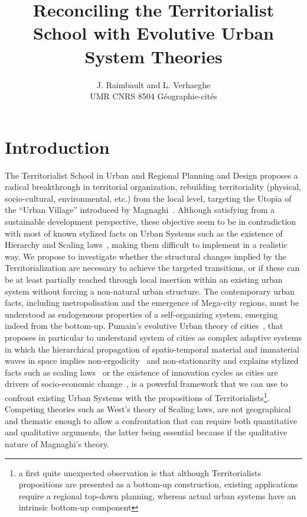 \documentclass{article}
\begin{document}
\title{Reconciling the Territorialist School with Evolutive Urban System Theories}
\date{}

\author{J. Raimbault and L. Verhaeghe\\
UMR CNRS 8504 G{\'e}ographie-cit{\'e}s
}

\maketitle



\section{Introduction}

The Territorialist School in Urban and Regional Planning and Design proposes a radical breakthrough in territorial organization, rebuilding territoriality (physical, socio-cultural, environmental, etc.) from the local level, targeting the Utopia of the ``Urban Village'' introduced by Magnaghi~\cite{magnaghi2014bioregion}. Although satisfying from a sustainable development perspective, these objective seem to be in contradiction with most of known stylized facts on Urban Systems such as the existence of Hierarchy and Scaling laws~\cite{magnaghi2005local}, making them difficult to implement in a realistic way. We propose to investigate whether the structural changes implied by the Territorialization are necessary to achieve the targeted transitions, or if these can be at least partially reached through local insertion within an existing urban system without forcing a non-natural urban structure. The contemporary urban facts, including metropolisation and the emergence of Mega-city regions, must be understood as endogeneous properties of a self-organizing system, emerging indeed from the bottom-up. Pumain's evolutive Urban theory of cities~\cite{pumain1997pour}, that proposes in particular to understand system of cities as complex adaptive systems in which the hierarchical propagation of spatio-temporal material and immaterial waves in space implies non-ergodicity~\cite{pumain2012urban} and non-stationarity and explains stylized facts such as scaling laws~\cite{pumain2006evolutionary} or the existence of innovation cycles as cities are drivers of socio-economic change~\cite{pumain2010theorie}, is a powerful framework that we can use to confront existing Urban Systems with the propositions of Territorialists\footnote{a first quite unexpected observation is that although Territorialists propositions are presented as a bottom-up construction, existing applications require a regional top-down planning, whereas actual urban systems have an intrinsic bottom-up component}. Competing theories such as West's theory of Scaling laws, are not geographical and thematic enough to allow a confrontation that can require both quantitative and qualitative arguments, the latter being essential because if the qualitative nature of Magnaghi's theory.
\end{document}
